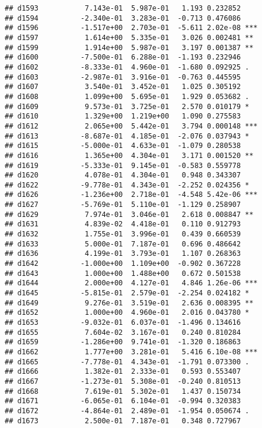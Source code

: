 \documentclass[
]{article}
\begin{document}
\begin{verbatim}
## d1593           7.143e-01  5.987e-01   1.193 0.232852    
## d1594          -2.340e-01  3.283e-01  -0.713 0.476086    
## d1596          -1.517e+00  2.703e-01  -5.611 2.02e-08 ***
## d1597           1.614e+00  5.335e-01   3.026 0.002481 ** 
## d1599           1.914e+00  5.987e-01   3.197 0.001387 ** 
## d1600          -7.500e-01  6.288e-01  -1.193 0.232946    
## d1602          -8.333e-01  4.960e-01  -1.680 0.092925 .  
## d1603          -2.987e-01  3.916e-01  -0.763 0.445595    
## d1607           3.540e-01  3.452e-01   1.025 0.305192    
## d1608           1.099e+00  5.695e-01   1.929 0.053682 .  
## d1609           9.573e-01  3.725e-01   2.570 0.010179 *  
## d1610           1.329e+00  1.219e+00   1.090 0.275583    
## d1612           2.065e+00  5.442e-01   3.794 0.000148 ***
## d1613          -8.687e-01  4.185e-01  -2.076 0.037943 *  
## d1615          -5.000e-01  4.633e-01  -1.079 0.280538    
## d1616           1.365e+00  4.304e-01   3.171 0.001520 ** 
## d1619          -5.333e-01  9.145e-01  -0.583 0.559778    
## d1620           4.078e-01  4.304e-01   0.948 0.343307    
## d1622          -9.778e-01  4.343e-01  -2.252 0.024356 *  
## d1626          -1.236e+00  2.718e-01  -4.548 5.42e-06 ***
## d1627          -5.769e-01  5.110e-01  -1.129 0.258907    
## d1629           7.974e-01  3.046e-01   2.618 0.008847 ** 
## d1631           4.839e-02  4.418e-01   0.110 0.912793    
## d1632           1.755e-01  3.996e-01   0.439 0.660539    
## d1633           5.000e-01  7.187e-01   0.696 0.486642    
## d1636           4.199e-01  3.793e-01   1.107 0.268363    
## d1642          -1.000e+00  1.109e+00  -0.902 0.367228    
## d1643           1.000e+00  1.488e+00   0.672 0.501538    
## d1644           2.000e+00  4.127e-01   4.846 1.26e-06 ***
## d1645          -5.815e-01  2.579e-01  -2.254 0.024182 *  
## d1649           9.276e-01  3.519e-01   2.636 0.008395 ** 
## d1652           1.000e+00  4.960e-01   2.016 0.043780 *  
## d1653          -9.032e-01  6.037e-01  -1.496 0.134616    
## d1655           7.604e-02  3.167e-01   0.240 0.810284    
## d1659          -1.286e+00  9.741e-01  -1.320 0.186863    
## d1662           1.777e+00  3.281e-01   5.416 6.10e-08 ***
## d1665          -7.778e-01  4.343e-01  -1.791 0.073300 .  
## d1666           1.382e-01  2.333e-01   0.593 0.553407    
## d1667          -1.273e-01  5.308e-01  -0.240 0.810513    
## d1668           7.619e-01  5.302e-01   1.437 0.150734    
## d1671          -6.065e-01  6.104e-01  -0.994 0.320383    
## d1672          -4.864e-01  2.489e-01  -1.954 0.050674 .  
## d1673           2.500e-01  7.187e-01   0.348 0.727967    

\end{verbatim}
\end{document}
